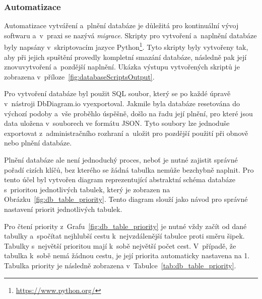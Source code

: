 \subsubsection*{Automatizace}
\label{subsubsec:implementation-technologies-database-automatization}
Automatizace vytváření a~plnění databáze je důležitá pro kontinuální vývoj softwaru a~v~praxi se nazývá \textit{migrace}. Skripty pro vytvoření a~naplnění databáze byly napsány v~skriptovacím jazyce Python\footnote{\href{https://www.python.org/}{https://www.python.org/}}. Tyto skripty byly vytvořeny tak, aby při jejich spuštění provedly kompletní smazání databáze, následně pak její znovuvytvoření a~pozdější naplnění. Ukázka výstupu vytvořených skriptů je zobrazena v~příloze~\ref{fig:databaseScriptsOutput}.

Pro vytvoření databáze byl použit SQL soubor, který se po každé úpravě v~nástroji DbDiagram.io vyexportoval. Jakmile byla databáze resetována do výchozí podoby a~vše proběhlo úspěšně, došlo na řadu její plnění, pro které jsou data uložena v~souborech ve formátu JSON. Tyto soubory lze jednoduše exportovat z~administračního rozhraní a~uložit pro pozdější použití při obnově nebo plnění databáze.

Plnění databáze ale není jednoduchý proces, neboť je nutné zajistit správné pořadí cizích klíčů, bez kterého se žádná tabulka nemůže bezchybně naplnit. Pro tento účel byl vytvořen diagram reprezentující abstraktní schéma databáze s~prioritou jednotlivých tabulek, který je zobrazen na Obrázku~\ref{fig:db_table_priority}. Tento diagram slouží jako návod pro správné nastavení priorit jednotlivých tabulek.

Pro čtení priority z~Grafu~\ref{fig:db_table_priority} je nutné vždy začít od dané tabulky a~spočítat nejhlubší cestu k~nejvzdálenější tabulce proti směru šipek. Tabulky s~největší prioritou mají k~sobě největší počet cest. V~případě, že tabulka k~sobě nemá žádnou cestu, je její priorita automaticky nastavena na 1. Tabulka priority je následně zobrazena v~Tabulce~\ref{tab:db_table_priority}.

